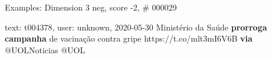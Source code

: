 \begin{frame}{Examples: Dimension 3 neg, score -2, \# 000029}
\footnotesize
\begin{alertblock}{text: t004378, user: unknown, 2020-05-30}
Ministério da Saúde \textbf{prorroga} \textbf{campanha} de vacinação contra 
gripe https://t.co/mlt3mI6V6B \textbf{via} @UOLNoticias @UOL 
\end{alertblock}
\end{frame}
